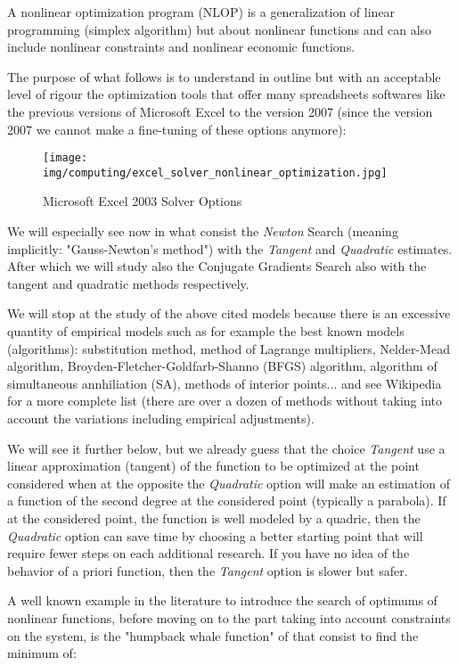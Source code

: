 	A nonlinear optimization program (NLOP) is a generalization of linear programming (simplex algorithm) but about nonlinear functions and can also include nonlinear constraints and nonlinear economic functions.

	The purpose of what follows is to understand in outline but with an acceptable level of rigour the optimization tools that offer many spreadsheets softwares like the previous versions of Microsoft Excel to the version 2007 (since the version 2007 we cannot make a fine-tuning of these options anymore):
	\begin{figure}[H]
		\centering
		\texttt{[image: img/computing/excel\_solver\_nonlinear\_optimization.jpg]}
		\caption{Microsoft Excel 2003 Solver Options}
	\end{figure}
	 We will especially see now in what consist the \textit{Newton} Search (meaning implicitly: "Gauss-Newton's method") with the \textit{Tangent} and \textit{Quadratic} estimates. After which we will study also the Conjugate Gradients Search also with the tangent and quadratic methods respectively.
	 \begin{tcolorbox}[title=Remark,colframe=black,arc=10pt]
	We will stop at the study of the above cited models because there is an excessive quantity of empirical models such as for example the best known models (algorithms): substitution method, method of Lagrange multipliers, Nelder-Mead algorithm, Broyden-Fletcher-Goldfarb-Shanno (BFGS) algorithm, algorithm  of simultaneous annhiliation (SA), methods of interior points... and see Wikipedia for a more complete list (there are over a dozen of methods without taking into account the variations including empirical adjustments).
	\end{tcolorbox}
	We will see it further below, but we already guess that the choice \textit{Tangent} use a linear approximation (tangent) of the function to be optimized at the point considered when at the opposite the \textit{Quadratic} option will make an estimation of a function of the second degree at the considered point (typically a parabola). If at the considered point, the function is well modeled by a quadric, then the \textit{Quadratic} option can save time by choosing a better starting point that will require fewer steps on each additional research. If you have no idea of the behavior of a priori function, then the  \textit{Tangent} option is slower but safer.
	
	A well known example in the literature to introduce the search of optimums of nonlinear functions, before moving on to the part taking into account constraints on the system, is the "humpback whale function" of that consist to find the minimum of:
	
